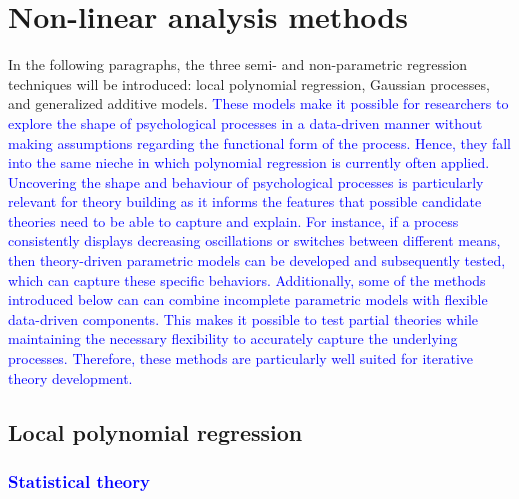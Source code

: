 \documentclass[man, floatsintext]{apa7}
\begin{document}
\section{Non-linear analysis methods}\label{method_introduction}

In the following paragraphs, the three semi- and non-parametric regression
techniques will be introduced: local polynomial regression, Gaussian processes,
and generalized additive models. \textcolor{blue}{ These models make it
  possible for researchers to explore the shape of psychological processes in a
  data-driven manner without making assumptions regarding the functional form
  of the
  process. Hence, they fall into the same nieche in which polynomial regression
  is
  currently often applied. Uncovering the shape and behaviour of psychological
  processes is particularly relevant for theory building as it informs the
  features that possible candidate theories need to be able to capture and
  explain. For instance, if a process consistently displays decreasing
  oscillations or switches between different means, then theory-driven
  parametric
  models can be developed and subsequently tested, which can capture these
  specific behaviors. Additionally, some of the methods introduced below can
  can
  combine incomplete parametric models with flexible data-driven components.
  This
  makes it possible to test partial theories while maintaining the necessary
  flexibility to accurately capture the underlying processes. Therefore,
  these methods are particularly well suited for iterative theory development.}

\subsection{Local polynomial regression}

\subsubsection{\textcolor{blue}{Statistical theory}}
\end{document}
